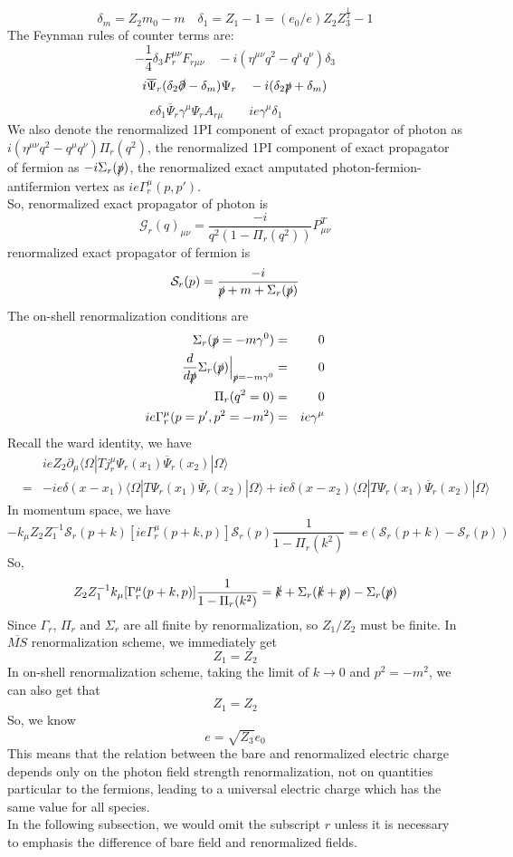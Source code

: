 \[\delta_m = Z_2 m_0 - m  \quad \delta_1 = Z_1 - 1 =(e_0/e) Z_2 Z_3^{\frac{1}{2}} - 1\]
The Feynman rules of counter terms are:
\[-\frac{1}{4}\delta_3 F_r^{\mu\nu}F_{r\mu\nu} \quad  -i(\eta^{\mu\nu}q^2-q^{\mu}q^{\nu})\delta_3\]
\[i\overline{\Psi}_r (\delta_{2}\slashed{\partial} - \delta_m)\Psi_r \quad -i(\delta_2\slashed{p}+\delta_m)\]
\[ e \delta_1 \overline{\Psi}_r\gamma^{\mu}\Psi_r A_{r\mu} \quad \quad ie \gamma^{\mu}\delta_1 \quad \quad  \quad \]
We also denote the renormalized 1PI component of exact propagator of photon as $i(\eta^{\mu\nu}q^2 -q^{\mu}q^{\nu})\Pi_r(q^2)$, the renormalized 1PI component of exact propagator of fermion as $-i\Sigma_r(\slashed{p})$, the renormalized exact amputated photon-fermion-antifermion vertex as $ie\Gamma^{\mu}_r(p,p')$. \\
So, renormalized exact propagator of photon is
\[\mathcal{G}_r(q)_{\mu\nu} = \frac{-i}{q^2(1-\Pi_r(q^2))}P^T_{\mu\nu}\]
renormalized exact propagator of fermion is
\[\mathcal{S}_r(p) = \frac{-i}{\slashed{p}+m+\Sigma_r(\slashed{p})}\]
The on-shell renormalization conditions are
\begin{eqnarray}
\Sigma_r(\slashed{p}=-m\gamma^0) &=& 0 \nonumber \\
\frac{d}{d\slashed{p}} \Sigma_r(\slashed{p}) \Big|_{\slashed{p} = -m\gamma^0} &=& 0 \nonumber \\
\Pi_r(q^2 = 0) &=& 0 \nonumber \\
ie\Gamma^{\mu}_r(p=p',p^2=-m^2) &=& ie\gamma^{\mu} \nonumber
\end{eqnarray}
Recall the ward identity, we have
\begin{eqnarray}
&\phantom{=}& ieZ_2\partial_{\mu} \langle \Omega | T j_r^{\mu} \Psi_r(x_1) \overline{\Psi}_r(x_2)| \Omega\rangle \nonumber \\
&=& -ie\delta(x-x_1)\langle \Omega | T \Psi_r(x_1) \overline{\Psi}_r(x_2)| \Omega\rangle + ie\delta(x-x_2)\langle \Omega | T \Psi_r(x_1) \overline{\Psi}_r(x_2)| \Omega\rangle \nonumber
\end{eqnarray}
In momentum space, we have
\[-k_{\mu} Z_2 Z_1^{-1} \mathcal{S}_r(p+k) [ie\Gamma^{\mu}_r(p+k,p)] \mathcal{S}_r(p) \frac{1}{1-\Pi_r(k^2)} = e(\mathcal{S}_r(p+k) - \mathcal{S}_r(p)) \]
So,
\[Z_2 Z_1^{-1} k_{\mu} [\Gamma^{\mu}_r(p+k,p)] \frac{1}{1-\Pi_r(k^2)} =\slashed{k}+\Sigma_r(\slashed{k}+\slashed{p})-\Sigma_r(\slashed
{p})\]
Since $\Gamma_r$, $\Pi_r$ and $\Sigma_r$ are all finite by renormalization, so $Z_1/Z_2$ must be finite.
In $\overline{MS}$ renormalization scheme, we immediately get
\[Z_1 = Z_2\]
In on-shell renormalization scheme, taking the limit of $k \to 0$ and $p^2 = -m^2$, we can also get that
\[Z_1 = Z_2\]
So, we know
\[e = \sqrt{Z_3}e_0\]
This means that the relation between the bare and renormalized electric charge depends only on the photon field strength renormalization, not on quantities particular to the fermions, leading to a universal electric charge which has the same value for all species.\\
In the following subsection, we would omit the subscript $r$ unless it is necessary to emphasis the difference of bare field and renormalized fields.

